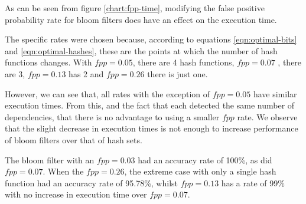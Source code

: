 As can be seen from figure \ref{chart:fpp-time}, modifying the false positive probability rate for bloom filters does have an effect on the execution time.

The specific rates were chosen because, according to equations \ref{eqn:optimal-bits} and \ref{eqn:optimal-hashes}, these are the points at which the number of hash functions changes. With $fpp=0.05$, there are 4 hash functions, $fpp=0.07$ , there are 3, $fpp=0.13$ has 2 and $fpp=0.26$ there is just one.

However, we can see that, all rates with the exception of $fpp=0.05$ have similar execution times. From this, and the fact that each detected the same number of dependencies, that there is no advantage to using a smaller $fpp$ rate. We observe that the slight decrease in execution times is not enough to increase performance of bloom filters over that of hash sets.

The bloom filter with an $fpp=0.03$ had an accuracy rate of 100\%, as did $fpp=0.07$. When the $fpp=0.26$, the extreme case with only a single hash function had an accuracy rate of 95.78\%, whilst $fpp=0.13$ has a rate of 99\% with no increase in execution time over $fpp=0.07$. 